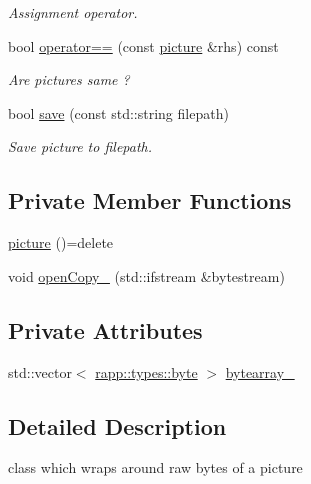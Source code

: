 \begin{DoxyCompactItemize}
\begin{DoxyCompactList}\small\item\em Assignment operator. \end{DoxyCompactList}\item 
bool \hyperlink{classrapp_1_1object_1_1picture_aad6e18da0e6be9ad7d195ee34b79bf2c}{operator==} (const \hyperlink{classrapp_1_1object_1_1picture}{picture} \&rhs) const 
\begin{DoxyCompactList}\small\item\em Are pictures same ? \end{DoxyCompactList}\item 
bool \hyperlink{classrapp_1_1object_1_1picture_afc2c1e50bd6192da8ee1588e3969a669}{save} (const std\-::string filepath)
\begin{DoxyCompactList}\small\item\em Save picture to filepath. \end{DoxyCompactList}\end{DoxyCompactItemize}
\subsection*{Private Member Functions}
\begin{DoxyCompactItemize}
\item 
\hyperlink{classrapp_1_1object_1_1picture_a4edfc5d343a51a181c743d76d18c10f9}{picture} ()=delete
\item 
void \hyperlink{classrapp_1_1object_1_1picture_aefe39dd6c7f1ef438e8232881c6450e1}{open\-Copy\-\_\-} (std\-::ifstream \&bytestream)
\end{DoxyCompactItemize}
\subsection*{Private Attributes}
\begin{DoxyCompactItemize}
\item 
std\-::vector$<$ \hyperlink{namespacerapp_1_1types_a1dbc9dc2ab4507d8fb58ac3a204d307b}{rapp\-::types\-::byte} $>$ \hyperlink{classrapp_1_1object_1_1picture_a4c6377918f2286dbbe320cd9a1d8767c}{bytearray\-\_\-}
\end{DoxyCompactItemize}


\subsection{Detailed Description}
class which wraps around raw bytes of a picture 

